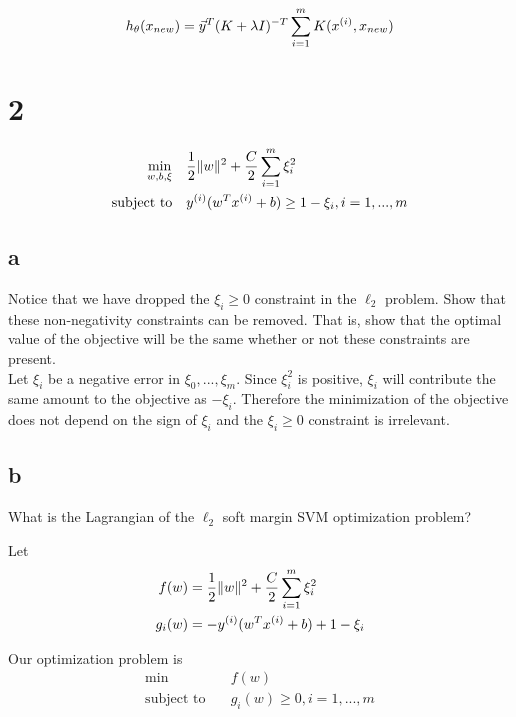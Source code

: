 \documentclass[11pt]{article}
\begin{document}
\begin{align*}
  h_{\theta}(x_{new}) &= \vec{y}^{T} (K + \lambda I)^{-T} \sum_{i=1}^{m} K(x^{(i)}, x_{new}) \\
\end{align*}

\section*{2}

\begin{align*}
  \underset{w,b,\xi}{\text{min}} &\quad \frac{1}{2} \|w\|^{2} + \frac{C}{2} \sum_{i=1}^{m} \xi_{i}^{2} \\
  \text{subject to} &\quad y^{(i)} (w^{T} x^{(i)} + b) \geq 1 - \xi_i, i = 1,...,m \\
\end{align*}

\subsection*{a}

Notice that we have dropped the $\xi_{i} \geq 0$ constraint in the $\ell_2$ problem. Show that these non-negativity constraints can be removed. That is, show that the optimal value of the objective will be the same whether or not these constraints are present. \\

Let $\xi_i$ be a negative error in $\xi_0,...,\xi_m$. Since $\xi_i^{2}$ is positive, $\xi_i$ will contribute the same amount to the objective as $-\xi_i$. Therefore the minimization of the objective does not depend on the sign of $\xi_i$ and the $\xi_i \geq 0$ constraint is irrelevant.

\subsection*{b}

What is the Lagrangian of the $\ell_2$ soft margin SVM optimization problem?

Let
\begin{align*}
  f(w)   &= \frac{1}{2} \|w\|^{2} + \frac{C}{2} \sum_{i=1}^{m} \xi_i^2 \\
  g_i(w) &= -y^{(i)} (w^T x^{(i)} + b) + 1 - \xi_i \\
\end{align*}

Our optimization problem is
\begin{align*}
  \text{min}        &\quad f(w) \\
  \text{subject to} &\quad g_i(w) \geq 0, i = 1,...,m \\
\end{align*}
\end{document}
